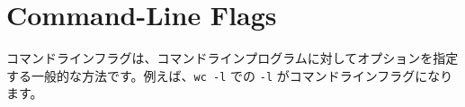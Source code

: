 \section{Command-Line Flags}

コマンドラインフラグは、コマンドラインプログラムに対してオプションを指定する一般的な方法です。例えば、\texttt{wc -l} での \texttt{-l} がコマンドラインフラグになります。





